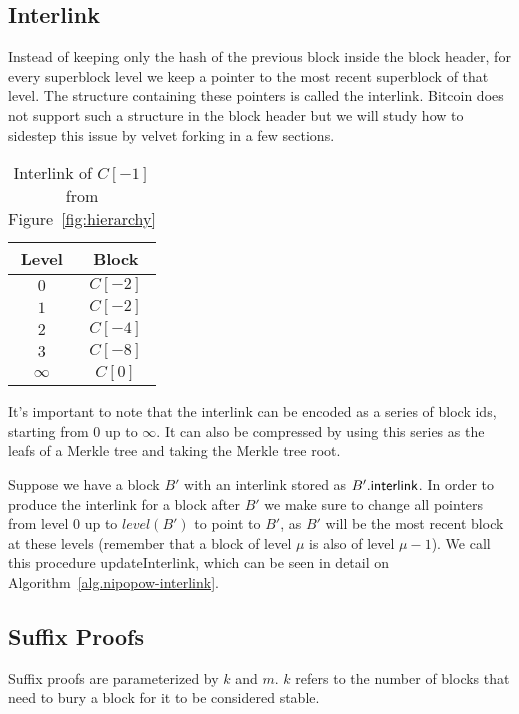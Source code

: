 \subsection{Interlink}
Instead of keeping only the hash of the previous block inside the block header, for every superblock level we keep a pointer to the most recent superblock of that level. The structure containing these pointers is called the interlink. Bitcoin does not support such a structure in the block header but we will study how to sidestep this issue by velvet forking in a few sections.

\begin{table}
  \centering
  \begin{tabular}{|c|c|}
    \hline
    Level & Block \\
    \hline
    $0$ & $C[-2]$ \\
    $1$ & $C[-2]$ \\
    $2$ & $C[-4]$ \\
    $3$ & $C[-8]$ \\
    $\infty$ & $C[0]$ \\
    \hline
  \end{tabular}
  \caption{Interlink of $C[-1]$ from Figure~\ref{fig:hierarchy}}
  \label{table:interlink-example}
\end{table}

It's important to note that the interlink can be encoded as a series of block ids, starting from $0$ up to $\infty$. It can also be compressed by using this series as the leafs of a Merkle tree and taking the Merkle tree root.

Suppose we have a block $B'$ with an interlink stored as $B'.{\sf interlink}$. In order to produce the interlink for a block after $B'$ we make sure to change all pointers from level $0$ up to $level(B')$ to point to $B'$, as $B'$ will be the most recent block at these levels (remember that a block of level $\mu$ is also of level $\mu-1$). We call this procedure {\sf updateInterlink}, which can be seen in detail on Algorithm~\ref{alg.nipopow-interlink}.



\subsection{Suffix Proofs}
Suffix proofs are parameterized by $k$ and $m$. $k$ refers to the number of blocks that need to bury a block for it to be considered stable.

